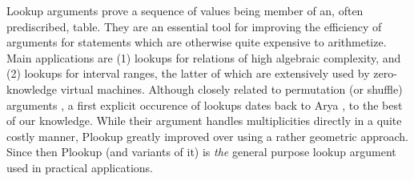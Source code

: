 \documentclass[11pt]{article}
\theoremstyle{definition}
\theoremstyle{definition}
\begin{document}
Lookup arguments prove a sequence of values being member of an, often prediscribed, table.
They are an essential tool for improving the efficiency of arguments for statements which are otherwise quite expensive to arithmetize. 
Main applications are (1) lookups for relations of high algebraic complexity, and (2) lookups for interval ranges, the latter of which are extensively used by zero-knowledge virtual machines.
Although closely related to permutation (or shuffle) arguments \cite{shuffle}, a first explicit occurence of lookups dates back to Arya \cite{Arya}, to the best of our knowledge.
While their argument handles multiplicities directly in a quite costly manner, Plookup \cite{Plookup} greatly improved over \cite{Arya} using a rather geometric approach.
Since then Plookup (and variants of it) is \textit{the} general purpose lookup argument used in practical applications. 
\end{document}
